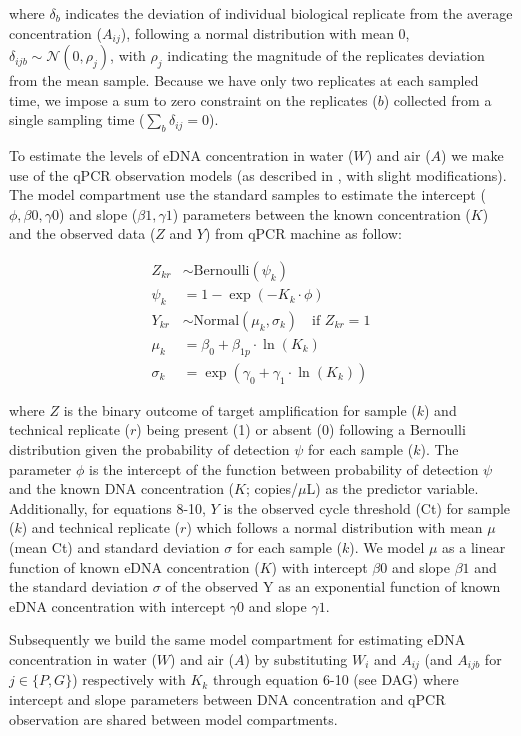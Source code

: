 \documentclass{article}
\begin{document}
where $\delta_b$ indicates the deviation of individual biological replicate from the average concentration ($A_{ij}$), following a normal distribution with mean 0, $\delta_{ijb} \sim \mathcal{N}(0,\rho_j)$, with $\rho_j$ indicating the magnitude of the replicates deviation from the mean sample. Because we have only two replicates at each sampled time, we impose a sum to zero constraint on the replicates ($b$) collected from a single sampling time ($\sum_b \delta_{ij} = 0$).

To estimate the levels of eDNA concentration in water ($W$) and air ($A$) we make use of the qPCR observation models (as described in \cite{guri2024, shelton2022}, with slight modifications). The model compartment use the standard samples to estimate the intercept ($\phi,\beta0,\gamma0$) and slope ($\beta1, \gamma1$) parameters between the known concentration ($K$) and the observed data ($Z$ and $Y$) from qPCR machine as follow:

\begin{align}
    Z_{kr} &\sim \mathrm{Bernoulli} \left(\psi_{k}\right)  \\
    \psi_{k} &= 1 - \exp(-K_{k} \cdot \phi) \\
    Y_{kr} &\sim \mathrm{Normal} (\mu_{k}, \sigma_{k}) \quad \text{if } Z_{kr} = 1 \\
    \mu_{k} &= \beta_0 + \beta_{1p} \cdot \ln (K_{k}) \\
    \sigma_{k} &= \exp(\gamma_0 + \gamma_1 \cdot \ln (K_{k}))
\end{align}

where $Z$ is the binary outcome of target amplification for sample ($k$) and technical replicate ($r$) being present (1) or absent (0) following a Bernoulli distribution given the probability of detection $\psi$ for each sample ($k$). The parameter $\phi$ is the intercept of the function between probability of detection $\psi$ and the known DNA concentration ($K$; copies/$\mu$L) as the predictor variable. Additionally, for equations 8-10, $Y$ is the observed cycle threshold (Ct) for sample ($k$) and technical replicate ($r$) which follows a normal distribution with mean $\mu$ (mean Ct) and standard deviation $\sigma$ for each sample ($k$). We model $\mu$ as a linear function of known eDNA concentration ($K$) with intercept $\beta0$ and slope $\beta1$ and the standard deviation $\sigma$ of the observed Y as an exponential function of known eDNA concentration with intercept $\gamma0$ and slope $\gamma1$.

Subsequently we build the same model compartment for estimating eDNA concentration in water ($W$) and air ($A$) by substituting $W_i$ and $A_{ij}$ (and $A_{ijb}$ for $j \in \{P,G\}$) respectively with $K_k$ through equation 6-10 (see DAG) where intercept and slope parameters between DNA concentration and qPCR observation are shared between model compartments.
\end{document}
